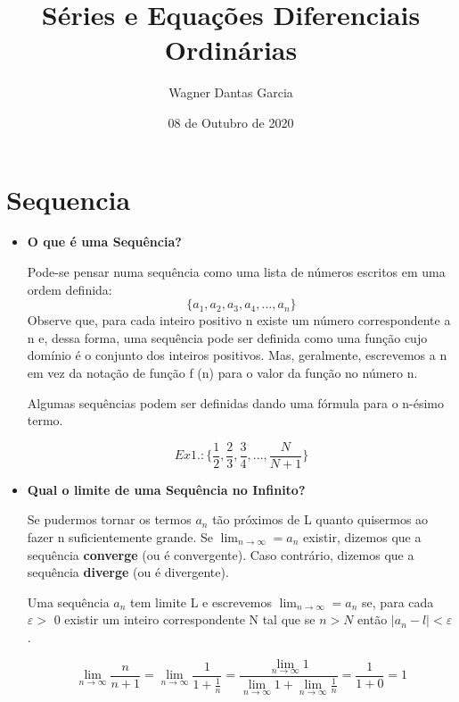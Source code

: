 \documentclass[12pt]{article}
\author{Wagner Dantas Garcia }
\title{Séries e Equações Diferenciais Ordinárias}
\date{08 de Outubro de 2020}
\begin{document}
  \maketitle
  \section{Sequencia}
  \begin{itemize}
    \item \large \textbf{O que é uma Sequência?}

    Pode-se pensar numa sequência como uma lista de números escritos em uma ordem definida:
    \begin{equation}
        \{{a_1, a_2, a_3, a_4, ... , a_n}\}
    \end{equation}
    Observe que, para cada inteiro positivo n existe um número correspondente a n e, dessa forma, uma sequência pode ser definida como uma função cujo domínio é o conjunto dos inteiros positivos. Mas, geralmente, escrevemos a n em vez da notação de função f (n) para o valor da função no número n. 

    Algumas sequências podem ser definidas dando uma fórmula para o n-ésimo termo.

    \begin{equation}
        Ex1.:\{{\frac{1}{2}, \frac{2}{3}, \frac{3}{4},..., \frac{N}{N+1}}\}
    \end{equation}

    \item \large \textbf{Qual o limite de uma Sequência no Infinito?}

    Se pudermos tornar os termos $a_n$ tão próximos de L quanto quisermos ao fazer n suficientemente grande. Se $\lim_{n\to\infty} = a_n$ existir, dizemos que a sequência \textbf{converge} (ou é convergente). Caso contrário, dizemos que a sequência \textbf{diverge} (ou é divergente).

    Uma sequência $a_n$ tem limite L e escrevemos $\lim_{n\to\infty} = a_n$ se, para cada $\varepsilon > $ 0 existir um inteiro correspondente N tal que se $n > N$ então $|a_n - l| < \varepsilon$.

    \begin{equation}
        \lim_{n\to\infty} \frac{n}{n+1} = \lim_{n\to\infty} \frac{1}{1+\frac{1}{n}} = \frac{\lim_{n\to\infty} 1 }{\lim_{n\to\infty}1 + \lim_{n\to\infty}\frac{1}{n}} = \frac{1}{1+0} = 1
    \end{equation} \\




\end{itemize}
\end{document}

